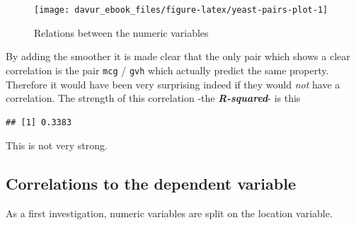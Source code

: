 \documentclass[]{book}
\newenvironment{Shaded}{\begin{snugshade}}{\end{snugshade}}
\newcommand{\CommentTok}[1]{\textcolor[rgb]{0.56,0.35,0.01}{\textit{#1}}}
\newcommand{\ControlFlowTok}[1]{\textcolor[rgb]{0.13,0.29,0.53}{\textbf{#1}}}
\newcommand{\DataTypeTok}[1]{\textcolor[rgb]{0.13,0.29,0.53}{#1}}
\newcommand{\DecValTok}[1]{\textcolor[rgb]{0.00,0.00,0.81}{#1}}
\newcommand{\KeywordTok}[1]{\textcolor[rgb]{0.13,0.29,0.53}{\textbf{#1}}}
\newcommand{\NormalTok}[1]{#1}
\newcommand{\OperatorTok}[1]{\textcolor[rgb]{0.81,0.36,0.00}{\textbf{#1}}}
\newcommand{\OtherTok}[1]{\textcolor[rgb]{0.56,0.35,0.01}{#1}}
\newcommand{\StringTok}[1]{\textcolor[rgb]{0.31,0.60,0.02}{#1}}
\begin{document}
\begin{figure}
\texttt{[image: davur\_ebook\_files/figure-latex/yeast-pairs-plot-1]} \caption{Relations between the numeric variables}\label{fig:yeast-pairs-plot}
\end{figure}

By adding the smoother it is made clear that the only pair which shows a clear correlation is the pair \texttt{mcg} / \texttt{gvh} which actually predict the same property. Therefore it would have been very surprising indeed if they would \emph{not} have a correlation. The strength of this correlation -the \textbf{\emph{R-squared}}- is this

\begin{Shaded}
\end{Shaded}

\begin{verbatim}
## [1] 0.3383
\end{verbatim}

This is not very strong.

\hypertarget{correlations-to-the-dependent-variable}{%
\subsection{Correlations to the dependent variable}\label{correlations-to-the-dependent-variable}}

As a first investigation, numeric variables are split on the location variable.

\begin{Shaded}
\end{Shaded}
\end{document}
